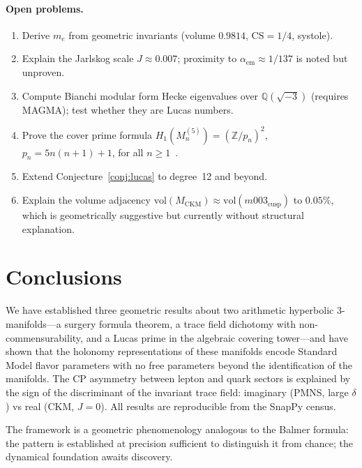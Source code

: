 \documentclass[11pt,a4paper]{article}
\theoremstyle{definition}
\theoremstyle{remark}
\newcommand{\ZZ}{\mathbb{Z}}
\newcommand{\QQ}{\mathbb{Q}}
\newcommand{\MCKM}{M_{\mathrm{CKM}}}
\begin{document}
\paragraph{Open problems.}
\begin{enumerate}[(1)]
\item Derive $m_e$ from geometric invariants
  (volume $0.9814$, CS$=1/4$, systole).
\item Explain the Jarlskog scale $J\approx0.007$;
  proximity to $\alpha_{\mathrm{em}}\approx1/137$
  is noted but unproven.
\item Compute Bianchi modular form Hecke eigenvalues over
  $\QQ(\sqrt{-3})$ (requires MAGMA); test whether they
  are Lucas numbers.
\item Prove the cover prime formula
  $H_1(M_n^{(5)})=(\ZZ/p_n)^2$, $p_n=5n(n+1)+1$,
  for all $n\geq1$~\cite{Gentry:Farey}.
\item Extend Conjecture~\ref{conj:lucas} to degree~12 and beyond.
\item Explain the volume adjacency
  $\mathrm{vol}(\MCKM)\approx\mathrm{vol}(m003_\mathrm{cusp})$
  to $0.05\%$, which is geometrically suggestive but currently
  without structural explanation.
\end{enumerate}

\section{Conclusions}
\label{sec:conclusions}

We have established three geometric results about two arithmetic
hyperbolic 3-manifolds---a surgery formula theorem, a trace field
dichotomy with non-commensurability, and a Lucas prime in the
algebraic covering tower---and have shown that the holonomy
representations of these manifolds encode Standard Model flavor
parameters with no free parameters beyond the identification of
the manifolds.
The CP asymmetry between lepton and quark sectors is explained
by the sign of the discriminant of the invariant trace field:
imaginary (PMNS, large $\delta$) vs real (CKM, $J=0$).
All results are reproducible from the SnapPy census.

The framework is a geometric phenomenology analogous to the
Balmer formula: the pattern is established at precision
sufficient to distinguish it from chance; the dynamical
foundation awaits discovery.

\end{document}
